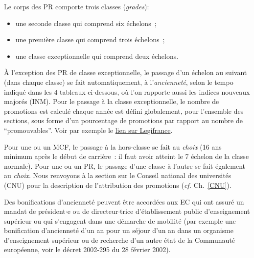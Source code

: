 Le corps des PR comporte trois
classes (\textit{grades}):
\begin{itemize}
\item une seconde classe qui comprend six \'echelons~;
\item une premi\`ere classe qui comprend trois \'echelons~;
\item une classe exceptionnelle qui comprend deux \'echelons.
\end{itemize}


\`A l'exception des PR de classe exceptionnelle,
le passage d'un \'echelon au suivant (dans chaque classe) se fait
automatiquement, \`a l'{\em anciennet\'e}, selon le tempo indiqu\'e
dans les 4 tableaux ci-dessous, o\`u l'on rapporte aussi les indices
nouveaux major\'es (INM). Pour le passage \`a la classe exceptionnelle, le nombre de promotions est calcul\'e chaque ann\'ee est d\'efini globalement, pour l'ensemble des sections, sous forme d'un pourcentage de promotions par rapport au nombre de ``promouvables''. Voir par exemple le
\href{www.legifrance.gouv.fr/affichTexte.do?cidTexte=JORFTEXT000025756970\&dateTexte=\&categorieLien=id}{lien sur Legifrance}.

Pour une ou un MCF, le passage \`a la hors-classe se fait au {\em choix} (16 ans minimum
apr\`es le d\'ebut de carri\`ere~: il faut avoir atteint le
7\ieme{} \'echelon de la classe normale).
Pour une ou un PR, le passage d'une classe \`a l'autre se fait \'egalement au {\em choix}.
Nous renvoyons \`a la section sur le Conseil national des universit\'es (CNU) pour la
description de l'attribution des promotions ({\em cf.} Ch.~\ref{CNU}).

Des bonifications d'anciennet\'e peuvent \^etre accord\'ees aux EC
qui ont assur\'e un mandat de pr\'esident$\cdot$e
ou de directeur$\cdot$trice d'\'etablissement public d'enseignement sup\'erieur
ou qui s'engagent dans une d\'emarche de
mobilit\'e (par exemple une bonification d'anciennet\'e d'un an
pour un s\'ejour d'un an dans un organisme d'enseignement sup\'erieur
ou de recherche d'un autre \'etat de la Communaut\'e europ\'eenne,
voir le d\'ecret 2002-295 du 28 f\'evrier 2002).


